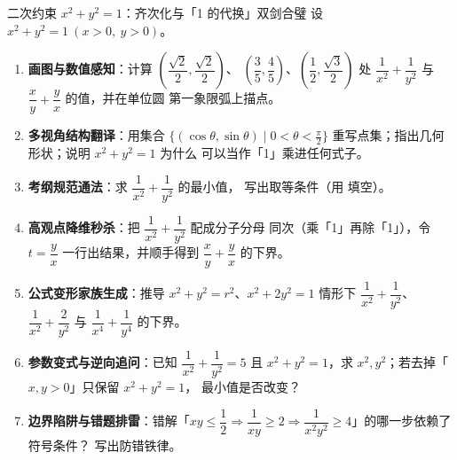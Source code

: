 \begin{masterq}{二次约束 $x^2+y^2=1$：齐次化与「1 的代换」双剑合璧}
设 $x^2+y^2=1\ (x>0,\ y>0)$。
\begin{enumerate}[label=(\arabic*), itemsep=3pt]
\item \textbf{画图与数值感知}：计算 $\left(\dfrac{\sqrt2}{2},\dfrac{\sqrt2}{2}\right)$、
$\left(\dfrac35,\dfrac45\right)$、$\left(\dfrac12,\dfrac{\sqrt3}{2}\right)$ 处
$\dfrac1{x^2}+\dfrac1{y^2}$ 与 $\dfrac{x}{y}+\dfrac{y}{x}$ 的值，并在单位圆
第一象限弧上描点。
\item \textbf{多视角结构翻译}：用集合 $\{(\cos\theta,\sin\theta)\mid
0<\theta<\tfrac\pi2\}$ 重写点集；指出几何形状；说明 $x^2+y^2=1$ 为什么
可以当作「1」乘进任何式子。
\item \textbf{考纲规范通法}：求 $\dfrac1{x^2}+\dfrac1{y^2}$ 的最小值，
写出取等条件（用 \tk{} 填空）。
\item \textbf{高观点降维秒杀}：把 $\dfrac1{x^2}+\dfrac1{y^2}$ 配成分子分母
同次（乘「1」再除「1」），令 $t=\dfrac{y}{x}$ 一行出结果，并顺手得到
$\dfrac{x}{y}+\dfrac{y}{x}$ 的下界。
\item \textbf{公式变形家族生成}：推导 $x^2+y^2=r^2$、$x^2+2y^2=1$ 情形下
$\dfrac1{x^2}+\dfrac1{y^2}$、$\dfrac1{x^2}+\dfrac2{y^2}$ 与
$\dfrac1{x^4}+\dfrac1{y^4}$ 的下界。
\item \textbf{参数变式与逆向追问}：已知 $\dfrac1{x^2}+\dfrac1{y^2}=5$ 且
$x^2+y^2=1$，求 $x^2,y^2$；若去掉「$x,y>0$」只保留 $x^2+y^2=1$，
最小值是否改变？
\item \textbf{边界陷阱与错题排雷}：错解「$xy\le\dfrac12\Rightarrow
\dfrac1{xy}\ge2\Rightarrow\dfrac1{x^2y^2}\ge4$」的哪一步依赖了符号条件？
写出防错铁律。
\end{enumerate}
\end{masterq}

